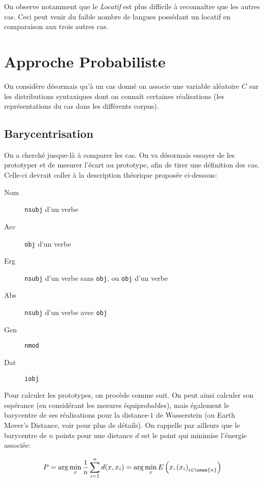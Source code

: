 \documentclass{article}
\begin{document}
On observe notamment que le \emph{Locatif} est plus difficile à reconnaître que les autres cas. Ceci peut venir du faible nombre de langues possédant un locatif en comparaison aux trois autres cas.

\section{Approche Probabiliste}\label{sec:probas}
On considère désormais qu'à un cas donné on associe une variable aléatoire $C$ sur les distributions syntaxiques dont on connaît certaines réalisations (les représentations du cas dans les différents corpus).

\subsection{Barycentrisation}\label{subsec:bary}
On a cherché jusque-là à comparer les cas.
On va désormais essayer de les prototyper et de mesurer l'écart au prototype, afin de tirer une définition des cas.
Celle-ci devrait coller à la description théorique proposée ci-dessous:
\begin{multicols}{2}
        \begin{description}
                \item[Nom] \texttt{nsubj} d'un verbe
                \item[Acc] \texttt{obj} d'un verbe
                \item[Erg] \texttt{nsubj} d'un verbe sans \texttt{obj}, ou \texttt{obj} d'un verbe
                \item[Abs] \texttt{nsubj} d'un verbe avec \texttt{obj}
                \item[Gen] \texttt{nmod}
                \item[Dat] \texttt{iobj}
        \end{description}
\end{multicols}
Pour calculer les prototypes, on procède comme suit.
On peut ainsi calculer son espérance (en considérant les mesures équiprobables), mais également le barycentre de ses réalisations pour la distance-$1$ de Wasserstein (ou Earth Mover's Distance, voir \cite{PythonPOT} pour plus de détails).
On rappelle par ailleurs que le barycentre de $n$ points pour une distance $d$ est le point qui minimise l'énergie associée:

\begin{equation*}
        P = \arg\min_{x} \frac{1}{n}\sum_{i = 1}^{n} d(x, x_{i}) = \arg\min_{x} E\left(x, \left(x_{i}\right)_{i \in \onen{n}}\right)
\end{equation*}
\end{document}
